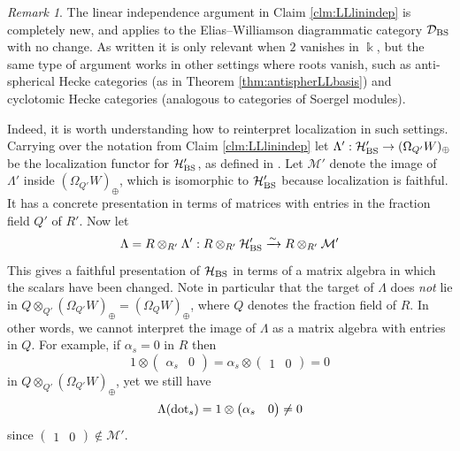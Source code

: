 \documentclass{amsart}
\theoremstyle{plain}
\theoremstyle{definition}
\theoremstyle{remark}
\newtheorem{rem}[thm]{Remark}
\numberwithin{equation}{section}
\begin{document}
\begin{rem} \label{rem:locpres}
The linear independence argument in Claim \ref{clm:LLlinindep} is completely new, and applies to the Elias--Williamson diagrammatic category $\mathcal{D}_{\rm BS}$ with no change.
As written it is only relevant when $2$ vanishes in $\Bbbk$, but the same type of argument works in other settings where roots vanish, such as anti-spherical Hecke categories (as in Theorem \ref{thm:antispherLLbasis}) and cyclotomic Hecke categories (analogous to categories of Soergel modules). 

Indeed, it is worth understanding how to reinterpret localization in such settings.
Carrying over the notation from Claim \ref{clm:LLlinindep} let $\Lambda' : \mathcal{H}'_{\rm BS} \rightarrow (\Omega_{Q'} W)_{\oplus}$ be the localization functor for $\mathcal{H}'_{\rm BS}$, as defined in \cite{ew-loccalc}. 
Let $\mathcal{M}'$ denote the image of $\Lambda'$ inside $(\Omega_{Q'} W)_{\oplus}$, which is isomorphic to $\mathcal{H}'_{\rm BS}$ because localization is faithful.
It has a concrete presentation in terms of matrices with entries in the fraction field $Q'$ of $R'$. 
Now let 
\begin{equation}
\Lambda = R \otimes_{R'} \Lambda' : R \otimes_{R'} \mathcal{H}'_{\rm BS} \xrightarrow{\sim} R \otimes_{R'} \mathcal{M}'
\end{equation}
This gives a faithful presentation of $\mathcal{H}_{\rm BS}$ in terms of a matrix algebra in which the scalars have been changed. 
Note in particular that the target of $\Lambda$ does \emph{not} lie in $Q \otimes_{Q'}(\Omega_{Q'} W)_{\oplus} = (\Omega_{Q} W)_{\oplus}$, where $Q$ denotes the fraction field of $R$. 
In other words, we cannot interpret the image of $\Lambda$ as a matrix algebra with entries in $Q$. 
For example, if $\alpha_s=0$ in $R$ then
\begin{equation*}
1 \otimes 
\begin{pmatrix}
\alpha_s & 0
\end{pmatrix} = \alpha_s \otimes 
\begin{pmatrix}
1 & 0
\end{pmatrix}
=0
\end{equation*}
in $Q \otimes_{Q'} (\Omega_{Q'} W)_{\oplus}$, yet we still have
\begin{equation*}
\Lambda({\rm dot}_s)= 1 \otimes 
\begin{pmatrix}
\alpha_s & 0
\end{pmatrix} \neq 0
\end{equation*}
since $\begin{pmatrix} 1 & 0 \end{pmatrix} \notin \mathcal{M}'$. 
\end{rem}



\end{document}
